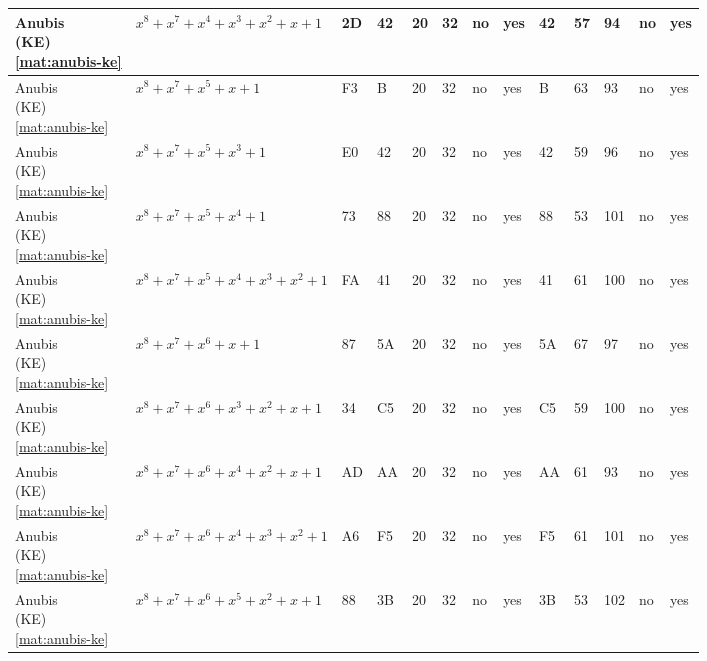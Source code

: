\begin{tiny}
\begin{longtable}{|l|l|l|l|l|l|l|l|l|l|l|l|l|}
\shortstack{Anubis \\ (KE) \\ \eqref{mat:anubis-ke}} & $x^8 + x^7 + x^4 + x^3 + x^2 + x + 1$ & 2D & 42 & 20 & 32 & no & yes & 42 & 57 & 94 & no & yes \\ \hline
\shortstack{Anubis \\ (KE) \\ \eqref{mat:anubis-ke}} & $x^8 + x^7 + x^5 + x + 1$ & F3 & B & 20 & 32 & no & yes & B & 63 & 93 & no & yes \\ \hline
\shortstack{Anubis \\ (KE) \\ \eqref{mat:anubis-ke}} & $x^8 + x^7 + x^5 + x^3 + 1$ & E0 & 42 & 20 & 32 & no & yes & 42 & 59 & 96 & no & yes \\ \hline
\shortstack{Anubis \\ (KE) \\ \eqref{mat:anubis-ke}} & $x^8 + x^7 + x^5 + x^4 + 1$ & 73 & 88 & 20 & 32 & no & yes & 88 & 53 & 101 & no & yes \\ \hline
\shortstack{Anubis \\ (KE) \\ \eqref{mat:anubis-ke}} & $x^8 + x^7 + x^5 + x^4 + x^3 + x^2 + 1$ & FA & 41 & 20 & 32 & no & yes & 41 & 61 & 100 & no & yes \\ \hline
\shortstack{Anubis \\ (KE) \\ \eqref{mat:anubis-ke}} & $x^8 + x^7 + x^6 + x + 1$ & 87 & 5A & 20 & 32 & no & yes & 5A & 67 & 97 & no & yes \\ \hline
\shortstack{Anubis \\ (KE) \\ \eqref{mat:anubis-ke}} & $x^8 + x^7 + x^6 + x^3 + x^2 + x + 1$ & 34 & C5 & 20 & 32 & no & yes & C5 & 59 & 100 & no & yes \\ \hline
\shortstack{Anubis \\ (KE) \\ \eqref{mat:anubis-ke}} & $x^8 + x^7 + x^6 + x^4 + x^2 + x + 1$ & AD & AA & 20 & 32 & no & yes & AA & 61 & 93 & no & yes \\ \hline
\shortstack{Anubis \\ (KE) \\ \eqref{mat:anubis-ke}} & $x^8 + x^7 + x^6 + x^4 + x^3 + x^2 + 1$ & A6 & F5 & 20 & 32 & no & yes & F5 & 61 & 101 & no & yes \\ \hline
\shortstack{Anubis \\ (KE) \\ \eqref{mat:anubis-ke}} & $x^8 + x^7 + x^6 + x^5 + x^2 + x + 1$ & 88 & 3B & 20 & 32 & no & yes & 3B & 53 & 102 & no & yes \\ \hline

\end{longtable}
\end{tiny}
